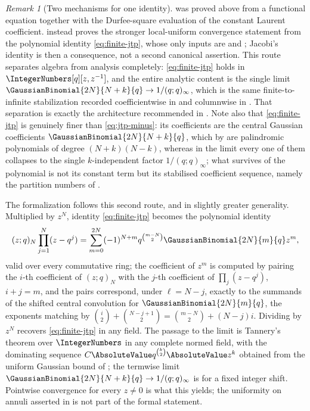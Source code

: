 \documentclass[11pt,a4paper,oneside,openany]{book}
\theoremstyle{definition}
\theoremstyle{remark}
\newtheorem{remark}[remark]{Remark}
\begin{document}
\begin{remark}[Two mechanisms for one identity]\label{rem:jtp-two-proofs}
 was proved above from a functional equation together with the Durfee-square evaluation of the constant Laurent coefficient.   instead proves the stronger local-uniform convergence statement from the polynomial identity \eqref{eq:finite-jtp}, whose only inputs are  and ; Jacobi's identity is then a consequence, not a second canonical assertion.  This route separates algebra from analysis completely: \eqref{eq:finite-jtp} holds in $\IntegerNumbers[q][z,z^{-1}]$, and the entire analytic content is the single limit $\GaussianBinomial{2N}{N+k}{q}\to1/(q;q)_\infty$, which is the same finite-to-infinite stabilization recorded coefficientwise in  and columnwise in .  That separation is exactly the architecture recommended in .  Note also that \eqref{eq:finite-jtp} is genuinely finer than \eqref{eq:jtp-minus}: its coefficients are the central Gaussian coefficients $\GaussianBinomial{2N}{N+k}{q}$, which by  are palindromic polynomials of degree $(N+k)(N-k)$, whereas in the limit every one of them collapses to the single $k$-independent factor $1/(q;q)_\infty$; what survives of the polynomial is not its constant term but its stabilised coefficient sequence, namely the partition numbers of .

The formalization follows this second route, and in slightly greater generality.  Multiplied by $z^N$, identity \eqref{eq:finite-jtp} becomes the polynomial identity
\[
 (z;q)_N\prod_{j=1}^{N}(z-q^{j})
 =\sum_{m=0}^{2N}(-1)^{N+m}q^{\binom{m-N}{2}}\GaussianBinomial{2N}{m}{q}z^{m},
\]
valid over every commutative ring; the coefficient of $z^m$ is computed by pairing the $i$-th coefficient of $(z;q)_N$ with the $j$-th coefficient of $\prod_j(z-q^j)$, $i+j=m$, and the pairs correspond, under $\ell=N-j$, exactly to the summands of the shifted central convolution  for $\GaussianBinomial{2N}{m}{q}$, the exponents matching by $\binom i2+\binom{N-j+1}2=\binom{m-N}2+(N-j)i$.  Dividing by $z^N$ recovers \eqref{eq:finite-jtp} in any field.  The passage to the limit is Tannery's theorem over $\IntegerNumbers$ in any complete normed field, with the dominating sequence $C\AbsoluteValue q^{\binom k2}\AbsoluteValue z^{k}$ obtained from the uniform Gaussian bound of ; the termwise limit $\GaussianBinomial{2N}{N+k}{q}\to1/(q;q)_\infty$ is  for a fixed integer shift.  Pointwise convergence for every $z\ne0$ is what this yields; the uniformity on annuli asserted in  is not part of the formal statement.
\end{remark}
\end{document}
